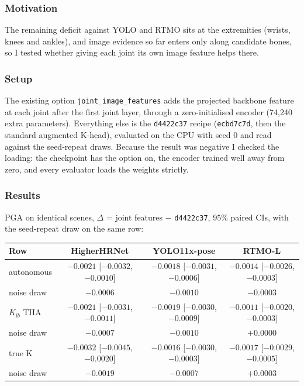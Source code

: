 \subsubsection{Motivation}

The remaining deficit against YOLO and RTMO sits at the extremities (wrists, knees and ankles), and image evidence so far enters only along candidate bones, so I tested whether giving each joint its own image feature helps there.

\subsubsection{Setup}

The existing option \texttt{joint\_image\_features} adds the projected backbone feature at each joint after the first joint layer, through a zero-initialised encoder (74,240 extra parameters).
Everything else is the \texttt{d4422c37} recipe (\texttt{ecbd7c7d}, then the standard augmented K-head), evaluated on the CPU with seed 0 and read against the seed-repeat draws.
Because the result was negative I checked the loading: the checkpoint has the option on, the encoder trained well away from zero, and every evaluator loads the weights strictly.

\subsubsection{Results}

PGA on identical scenes, $\Delta$ = joint features $-$ \texttt{d4422c37}, 95\% paired CIs, with the seed-repeat draw on the same row:

{\small\setlength{\tabcolsep}{4pt}
\begin{tabular}{lccc}
\hline
\textbf{Row} & \textbf{HigherHRNet} & \textbf{YOLO11x-pose} & \textbf{RTMO-L} \\
\hline
autonomous       & $-0.0021$ [$-0.0032$, $-0.0010$] & $-0.0018$ [$-0.0031$, $-0.0006$] & $-0.0014$ [$-0.0026$, $-0.0003$] \\
\quad noise draw & $-0.0006$ & $-0.0010$ & $-0.0003$ \\
$K_{lb}$ THA     & $-0.0021$ [$-0.0031$, $-0.0011$] & $-0.0019$ [$-0.0030$, $-0.0009$] & $-0.0011$ [$-0.0020$, $-0.0003$] \\
\quad noise draw & $-0.0007$ & $-0.0010$ & $+0.0000$ \\
true K           & $-0.0032$ [$-0.0045$, $-0.0020$] & $-0.0016$ [$-0.0030$, $-0.0003$] & $-0.0017$ [$-0.0029$, $-0.0005$] \\
\quad noise draw & $-0.0019$ & $-0.0007$ & $+0.0003$ \\
\hline
\end{tabular}
}


